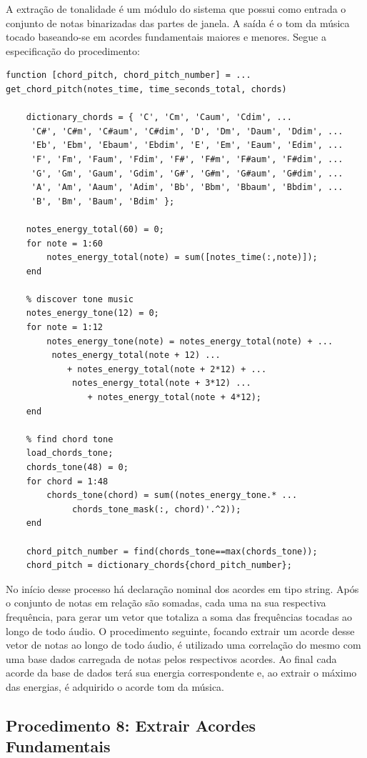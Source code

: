 A extração de tonalidade é um módulo do sistema que possui como entrada o conjunto de notas binarizadas das partes de janela. A saída é o tom da música tocado baseando-se em acordes fundamentais maiores e menores. Segue a especificação do procedimento:
\begin{lstlisting}
function [chord_pitch, chord_pitch_number] = ...
get_chord_pitch(notes_time, time_seconds_total, chords)
	
	dictionary_chords = { 'C', 'Cm', 'Caum', 'Cdim', ...
     'C#', 'C#m', 'C#aum', 'C#dim', 'D', 'Dm', 'Daum', 'Ddim', ...
     'Eb', 'Ebm', 'Ebaum', 'Ebdim', 'E', 'Em', 'Eaum', 'Edim', ...
     'F', 'Fm', 'Faum', 'Fdim', 'F#', 'F#m', 'F#aum', 'F#dim', ...
     'G', 'Gm', 'Gaum', 'Gdim', 'G#', 'G#m', 'G#aum', 'G#dim', ...
     'A', 'Am', 'Aaum', 'Adim', 'Bb', 'Bbm', 'Bbaum', 'Bbdim', ...
     'B', 'Bm', 'Baum', 'Bdim' };

	notes_energy_total(60) = 0;
	for note = 1:60
		notes_energy_total(note) = sum([notes_time(:,note)]);
	end

	% discover tone music
	notes_energy_tone(12) = 0;
	for note = 1:12
		notes_energy_tone(note) = notes_energy_total(note) + ...
		 notes_energy_total(note + 12) ...
			+ notes_energy_total(note + 2*12) + ...
			 notes_energy_total(note + 3*12) ...
				+ notes_energy_total(note + 4*12);
	end

	% find chord tone
	load_chords_tone;
	chords_tone(48) = 0;
	for chord = 1:48
		chords_tone(chord) = sum((notes_energy_tone.* ...
			 chords_tone_mask(:, chord)'.^2));
	end

	chord_pitch_number = find(chords_tone==max(chords_tone));
	chord_pitch = dictionary_chords{chord_pitch_number};

\end{lstlisting}

No início desse processo há declaração nominal dos acordes em tipo string. Após o conjunto de notas em relação são somadas, cada uma na sua respectiva frequência, para gerar um vetor que totaliza a soma das frequências tocadas ao longo de todo áudio. O procedimento seguinte, focando extrair um acorde desse vetor de notas ao longo de todo áudio, é utilizado uma correlação do mesmo com uma base dados carregada de notas pelos respectivos acordes. Ao final cada acorde da base de dados terá sua energia correspondente e, ao extrair o máximo das energias, é adquirido o acorde tom da música.

\subsection{Procedimento 8: Extrair Acordes Fundamentais}

